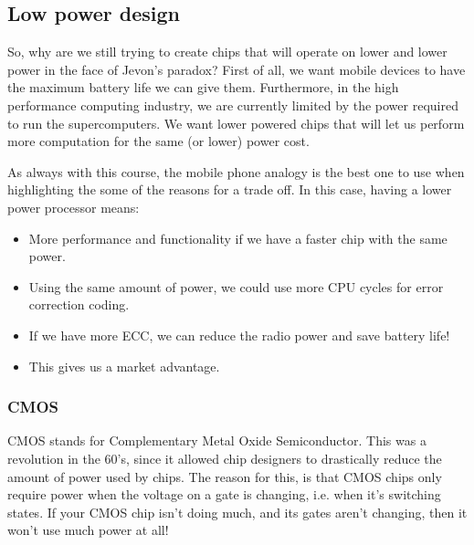 \subsection{Low power design}

So, why are we still trying to create chips that will operate on lower and lower
power in the face of Jevon's paradox? First of all, we want mobile devices to
have the maximum battery life we can give them. Furthermore, in the high
performance computing industry, we are currently limited by the power required
to run the supercomputers. We want lower powered chips that will let us perform
more computation for the same (or lower) power cost.

As always with this course, the mobile phone analogy is the best one to use when
highlighting the some of the reasons for a trade off. In this case, having a
lower power processor means:

\begin{mymulticols}
  \begin{itemize}
    \item More performance and functionality if we have a faster chip with the 
      same power.
    \item Using the same amount of power, we could use more CPU cycles for 
      error correction coding.
    \item If we have more ECC, we can reduce the radio power and save battery
      life!
    \item This gives us a market advantage.
  \end{itemize}
\end{mymulticols}

\subsubsection{CMOS}


CMOS stands for Complementary Metal Oxide Semiconductor. This was a revolution
in the 60's, since it allowed chip designers to drastically reduce the amount of
power used by chips. The reason for this, is that CMOS chips only require power
when the voltage on a gate is changing, i.e. when it's switching states. If your
CMOS chip isn't doing much, and its gates aren't changing, then it won't use
much power at all!

